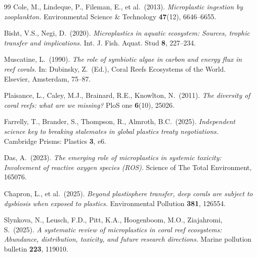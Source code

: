 ﻿\documentclass[12pt,a4paper]{article}
\theoremstyle{definition}
\theoremstyle{remark}
\begin{document}
\begin{thebibliography}{99}
Cole, M., Lindeque, P., Fileman, E., et al.\ (2013).
\textit{Microplastic ingestion by zooplankton.}
Environmental Science \& Technology \textbf{47}(12), 6646--6655.

Bisht, V.S., Negi, D.\ (2020).
\textit{Microplastics in aquatic ecosystem: Sources, trophic transfer and
implications.} Int. J. Fish. Aquat. Stud \textbf{8}, 227--234.

Muscatine, L.\ (1990).
\textit{The role of symbiotic algae in carbon and energy flux in reef corals.}
In: Dubinsky, Z.\ (Ed.), Coral Reefs Ecosystems of the World.
Elsevier, Amsterdam, 75--87.

Plaisance, L., Caley, M.J., Brainard, R.E., Knowlton, N.\ (2011).
\textit{The diversity of coral reefs: what are we missing?}
PloS one \textbf{6}(10), 25026.

Farrelly, T., Brander, S., Thompson, R., Almroth, B.C.\ (2025).
\textit{Independent science key to breaking stalemates in global plastics
treaty negotiations.} Cambridge Prisms: Plastics \textbf{3}, e6.

Das, A.\ (2023).
\textit{The emerging role of microplastics in systemic toxicity: Involvement
of reactive oxygen species (ROS).}
Science of The Total Environment, 165076.

Chapron, L., et al.\ (2025).
\textit{Beyond plastisphere transfer, deep corals are subject to dysbiosis
when exposed to plastics.}
Environmental Pollution \textbf{381}, 126554.

Slynkova, N., Leusch, F.D., Pitt, K.A., Hoogenboom, M.O., Ziajahromi, S.\ (2025).
\textit{A systematic review of microplastics in coral reef ecosystems:
Abundance, distribution, toxicity, and future research directions.}
Marine pollution bulletin \textbf{223}, 119010.

\end{thebibliography}
\end{document}
